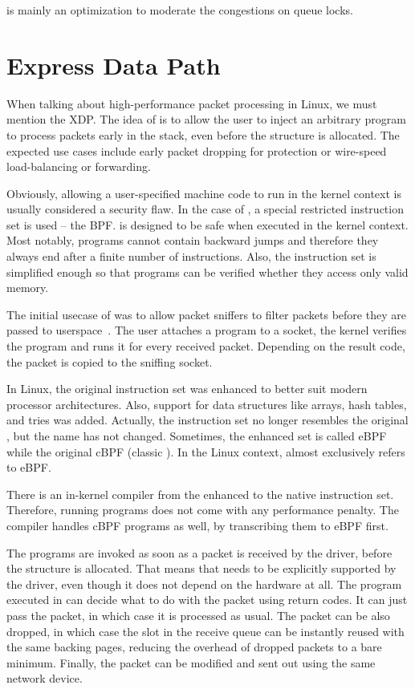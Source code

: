  is mainly an optimization to moderate the congestions on queue locks.

\section{Express Data Path}
\label{sec:xdp}

When talking about high-performance packet processing in Linux, we must
mention the \acrfull{XDP}. The idea of  is to allow the user to inject an
arbitrary program to process packets early in the stack, even before the \skb{}
structure is allocated. The expected use cases include early packet dropping
for  protection or wire-speed load-balancing or forwarding.

Obviously, allowing a user-specified machine code to run in the kernel context is
usually considered a security flaw. In the case of , a special restricted
instruction set is used -- the \acrlong{BPF}.  is designed to be safe when
executed in the kernel context. Most notably,  programs cannot contain
backward jumps and therefore they always end after a finite number of
instructions. Also, the instruction set is simplified enough so that programs
can be verified whether they access only valid memory.

The initial usecase of  was to allow packet sniffers to filter packets
before they are passed to userspace~\cite{bpf-usenix}. The user attaches
a  program to a socket, the kernel verifies the program and runs it
for every received packet. Depending on the result code, the packet is copied
to the sniffing socket.

In Linux, the original  instruction set was enhanced to better suit modern
processor architectures. Also, support for data structures like arrays, hash
tables, and tries was added. Actually, the instruction set no longer resembles the original ,
but the name has not changed. Sometimes, the enhanced set is called eBPF while
the original cBPF (classic ). In the Linux context,  almost
exclusively refers to eBPF.

There is an in-kernel  compiler from the enhanced  to the native
instruction set. Therefore, running  programs does not come with any
performance penalty. The compiler handles cBPF programs as well, by
transcribing them to eBPF first.

The  programs are invoked as soon as a packet is received by the driver,
before the \skb{} structure is allocated. That means that  needs to be
explicitly supported by the driver, even though it does not depend on the hardware at all.
The program executed in  can decide what to do with the packet using return codes.
It can just pass the packet, in which case it is processed as usual. The packet
can be also dropped, in which case the slot in the receive queue can be instantly reused
with the same backing pages, reducing the overhead of dropped packets to a bare
minimum. Finally, the packet can be modified and sent out using the same
network device.

